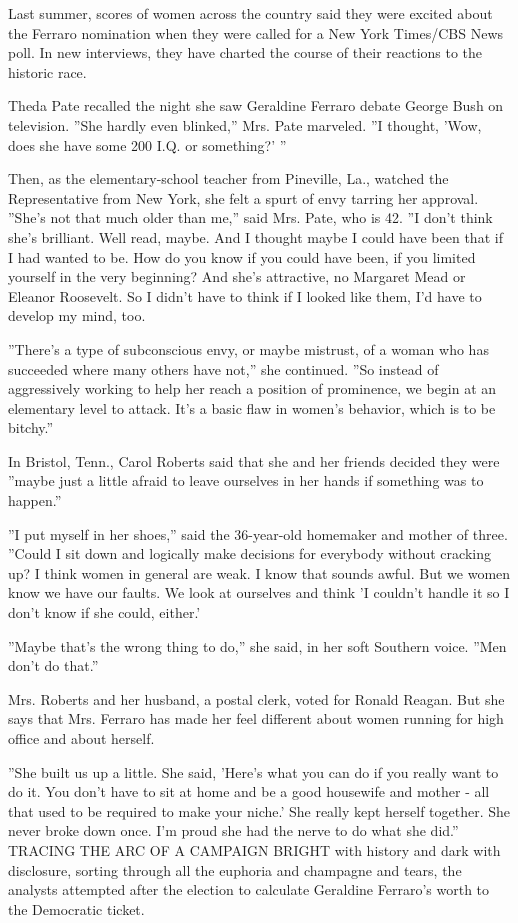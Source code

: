 Last summer, scores of women across the country said they were excited
about the Ferraro nomination when they were called for a New York
Times/CBS News poll. In new interviews, they have charted the course of
their reactions to the historic race.

Theda Pate recalled the night she saw Geraldine Ferraro debate George
Bush on television. ''She hardly even blinked,'' Mrs. Pate marveled. ''I
thought, 'Wow, does she have some 200 I.Q. or something?' ''

Then, as the elementary-school teacher from Pineville, La., watched the
Representative from New York, she felt a spurt of envy tarring her
approval. ''She's not that much older than me,'' said Mrs. Pate, who is
42. ''I don't think she's brilliant. Well read, maybe. And I thought
maybe I could have been that if I had wanted to be. How do you know if
you could have been, if you limited yourself in the very beginning? And
she's attractive, no Margaret Mead or Eleanor Roosevelt. So I didn't
have to think if I looked like them, I'd have to develop my mind, too.

''There's a type of subconscious envy, or maybe mistrust, of a woman who
has succeeded where many others have not,'' she continued. ''So instead
of aggressively working to help her reach a position of prominence, we
begin at an elementary level to attack. It's a basic flaw in women's
behavior, which is to be bitchy.''

In Bristol, Tenn., Carol Roberts said that she and her friends decided
they were ''maybe just a little afraid to leave ourselves in her hands
if something was to happen.''

''I put myself in her shoes,'' said the 36-year-old homemaker and mother
of three. ''Could I sit down and logically make decisions for everybody
without cracking up? I think women in general are weak. I know that
sounds awful. But we women know we have our faults. We look at ourselves
and think 'I couldn't handle it so I don't know if she could, either.'

''Maybe that's the wrong thing to do,'' she said, in her soft Southern
voice. ''Men don't do that.''

Mrs. Roberts and her husband, a postal clerk, voted for Ronald Reagan.
But she says that Mrs. Ferraro has made her feel different about women
running for high office and about herself.

''She built us up a little. She said, 'Here's what you can do if you
really want to do it. You don't have to sit at home and be a good
housewife and mother - all that used to be required to make your niche.'
She really kept herself together. She never broke down once. I'm proud
she had the nerve to do what she did.'' TRACING THE ARC OF A CAMPAIGN
BRIGHT with history and dark with disclosure, sorting through all the
euphoria and champagne and tears, the analysts attempted after the
election to calculate Geraldine Ferraro's worth to the Democratic
ticket.

